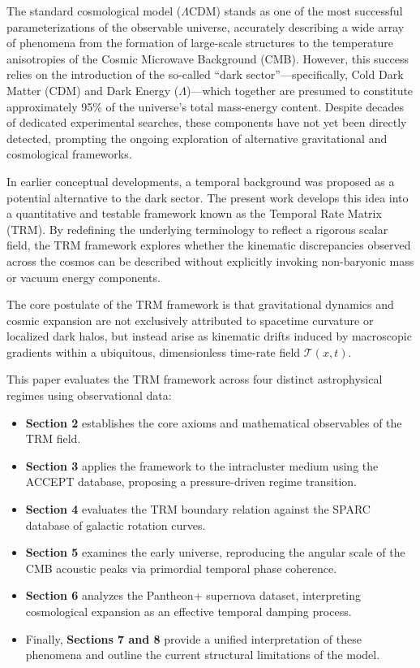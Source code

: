 \documentclass[11pt]{article}
\begin{document}
	The standard cosmological model ($\Lambda$CDM) stands as one of the most successful parameterizations of the observable universe, accurately describing a wide array of phenomena from the formation of large-scale structures to the temperature anisotropies of the Cosmic Microwave Background (CMB). However, this success relies on the introduction of the so-called ``dark sector''—specifically, Cold Dark Matter (CDM) and Dark Energy ($\Lambda$)—which together are presumed to constitute approximately 95\% of the universe's total mass-energy content. Despite decades of dedicated experimental searches, these components have not yet been directly detected, prompting the ongoing exploration of alternative gravitational and cosmological frameworks.

	In earlier conceptual developments, a temporal background was proposed as a potential alternative to the dark sector. The present work develops this idea into a quantitative and testable framework known as the Temporal Rate Matrix (TRM). By redefining the underlying terminology to reflect a rigorous scalar field, the TRM framework explores whether the kinematic discrepancies observed across the cosmos can be described without explicitly invoking non-baryonic mass or vacuum energy components.

	The core postulate of the TRM framework is that gravitational dynamics and cosmic expansion are not exclusively attributed to spacetime curvature or localized dark halos, but instead arise as kinematic drifts induced by macroscopic gradients within a ubiquitous, dimensionless time-rate field $\mathcal{T}(x,t)$.

	This paper evaluates the TRM framework across four distinct astrophysical regimes using observational data:

	\begin{itemize}
		\item \textbf{Section 2} establishes the core axioms and mathematical observables of the TRM field.
		\item \textbf{Section 3} applies the framework to the intracluster medium using the ACCEPT database, proposing a pressure-driven regime transition.
		\item \textbf{Section 4} evaluates the TRM boundary relation against the SPARC database of galactic rotation curves.
		\item \textbf{Section 5} examines the early universe, reproducing the angular scale of the CMB acoustic peaks via primordial temporal phase coherence.
		\item \textbf{Section 6} analyzes the Pantheon+ supernova dataset, interpreting cosmological expansion as an effective temporal damping process.
		\item Finally, \textbf{Sections 7 and 8} provide a unified interpretation of these phenomena and outline the current structural limitations of the model.
	\end{itemize}
\end{document}
